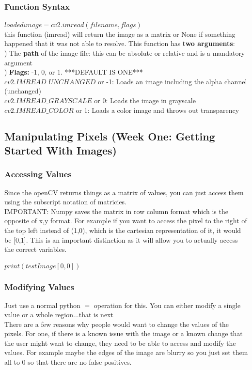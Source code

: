 \documentclass[fleqn]{article}
\begin{document}
    \subsubsection{Function Syntax}
    \textbf{$loaded image = cv2.imread(filename, flags)$}\\
    \tab this function (imread) will return the image as a matrix or None if something happened that it was not able to resolve.
    \tab This function has \textbf{two arguments}:\\
    \tab {}) The \textbf{path} of the image file: this can be absolute or relative and is a mandatory argument\\
    \tab {}) \textbf{Flags:} -1, 0, or 1. ***DEFAULT IS ONE***\\
    \indent \indent $cv2.IMREAD\_UNCHANGED$ or -1: Loads an image including the alpha channel (unchanged)\\
    \indent \indent   $cv2.IMREAD\_GRAYSCALE$ or 0: Loads the image in grayscale\\
    \indent \indent  $cv2.IMREAD\_COLOR$ or 1: Loads a color image and throws out transparency\\

    \newpage
    \clearpage
    \subsection{Manipulating Pixels (Week One: Getting Started With Images)}
    \subsubsection{Accessing Values}
    \indent Since the openCV returns things as a matrix of values, you can just access them using the subscript notation of matricies.\\
    IMPORTANT: Numpy saves the matrix in row column format which is the opposite of x,y format. For example if you want to access the pixel to the right of the top left instead of (1,0), which is the cartesian representation of it, it would be [0,1]. This is an important distinction as it will allow you to actually access the correct variables.\\

    \begin{center}
      $print(testImage[0,0])$
    \end{center}


    \subsubsection{Modifying Values}
    Just use a normal python $=$ operation for this. You can either modify a single value or a whole region...that is next\\
    There are a few reasons why people would want to change the values of the pixels. For one, if there is a known issue with the image or a known change that the user might want to change, they need to be able to access and modify the values. For example maybe the edges of the image are blurry so you just set them all to 0 so that there are no false positives.
\end{document}
